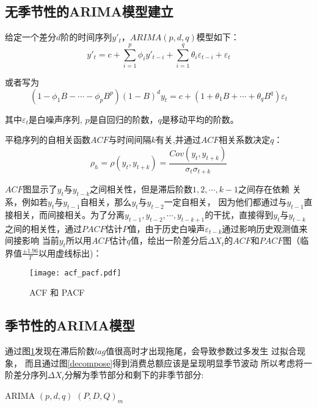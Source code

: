 \documentclass[12pt,a4paper]{nmmcm}
\begin{document}
\subsection{无季节性的ARIMA模型建立}
给定一个差分\(d\)阶的时间序列\(y'_t\)，\(ARIMA(p,d,q)\)模型如下：
\begin{equation}
  y'_t=c+\sum_{i=1}^p{\phi_i y'_{t-i}}+\sum_{i=1}^q{\theta_i\varepsilon_{t-i}}+\varepsilon_t
\end{equation}

或者写为\cite{Rob} \[(1-\phi_1B - \cdots - \phi_p B^p)  (1-B)^d y_{t} = c + (1 + \theta_1 B + \cdots + \theta_q B^q)\varepsilon_t\]

其中\(\varepsilon_t\)是白噪声序列, \(p\)是自回归的阶数，\(q\)是移动平均的阶数。

平稳序列的自相关函数\(ACF\)与时间间隔\(k\)有关,并通过\(ACF\)相关系数决定\(q\)：
\begin{equation}
  \rho_h = \rho(y_t,y_{t+k}) =\frac{Cov(y_t,y_{t+k})}{\sigma_t \sigma_{t+k}}
\end{equation}

\(ACF\)图显示了\(y_t\)与\(y_{t-k}\)之间相关性，但是滞后阶数\(1,2,\cdots,k-1\)之间存在依赖
关系\cite{Rob}，例如若\(y_t\)与\(y_{t-1}\)自相关，那么\(y_t\)与\(y_{t-2}\)一定自相关，
因为他们都通过与\(y_{t-1}\)直接相关，而间接相关。为了分离\(y_{t-1},
y_{t-2},\cdots,y_{t-k+1}\)的干扰，直接得到\(y_t\)与\(y_{t-k}\)之间的相关性，通过\(PACF\)估计\(P\)值，由于历史白噪声\(\varepsilon_{t-k}\)通过影响历史观测值来间接影响
当前\(y_t\)所以用\(ACF\)估计\(q\)值，绘出一阶差分后\(\Delta X_t\)的\(ACF\)和\(PACF\)图（临界值\(\frac{\pm1.96}{T}\)以用虚线标出)：
\begin{figure}[H] %
  \centering %
  \texttt{[image: acf\_pacf.pdf]} %
  \caption{ACF 和 PACF} %
  \label{acf_pacf} %
  \end{figure} 
  \subsection{季节性的ARIMA模型}
  通过图\ref{acf_pacf}发现在滞后阶数\(lag\)值很高时才出现拖尾，会导致参数过多发生
  过拟合现象， 而且通过图\ref{decompose}得到消费总额应该是呈现明显季节波动
  所以考虑将一阶差分序列\(\Delta X_t\)分解为季节部分和剩下的非季节部分\cite{Rob}:

\begin{center}
  ARIMA\;\;\;\;	\((p, d, q)\)	\;\;\;\;\; \((P, D, Q)_{m}\) \label{Season_decompose}
\end{center}
\end{document}
